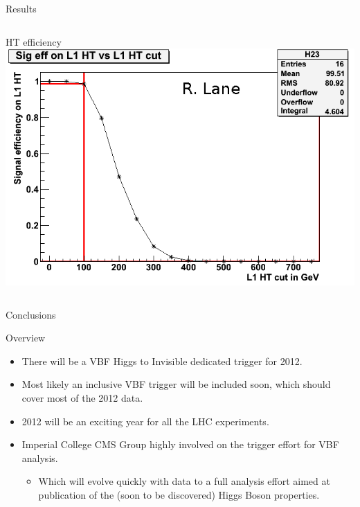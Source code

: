 \documentclass[8pt]{beamer}
\begin{document}
\begin{frame}{Results}
\begin{columns}
  \column[t]{5.5cm}
  \begin{block}{HT efficiency}
    \includegraphics[width=1.00\textwidth]{img/sig_eff_l1_ht.png} 
  \end{block}

\end{columns}

\end{frame}

\begin{frame}{Conclusions}
 
  \begin{block}{Overview}

    \begin{itemize}
      \item There will be a VBF Higgs to Invisible dedicated trigger for 2012. 
      \item Most likely an inclusive VBF trigger will be included soon, which should cover most of the 2012 data.
      \item 2012 will be an exciting year for all the LHC experiments. 
      \item Imperial College CMS Group highly involved on the trigger effort for VBF analysis.
      \begin{itemize}
        \item Which will evolve quickly with data to a full analysis effort aimed at publication of the
              (soon to be discovered) Higgs Boson properties.
      \end{itemize}
    \end{itemize}

  \end{block}
   
\end{frame}
\end{document}
